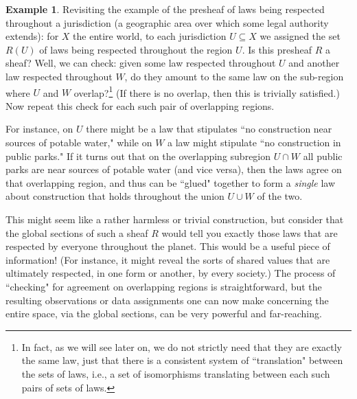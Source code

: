 \documentclass[a4paper]{book}
\theoremstyle{definition}
\newtheorem{example}{Example}[section]
\theoremstyle{definition}
\theoremstyle{definition}
\theoremstyle{theorem}
\theoremstyle{definition}
\begin{document}
	\begin{example}
	Revisiting the example of the presheaf of laws being respected throughout a jurisdiction (a geographic area over which some legal authority extends): for $X$ the entire world, to each jurisdiction $U \subseteq  X$ we assigned the set $R(U)$ of laws being respected throughout the region $U$. Is this presheaf $R$ a sheaf? Well, we can check: given some law respected throughout $U$ and another law respected throughout $W$, do they amount to the same law on the sub-region where $U$ and $W$ overlap?\footnote{In fact, as we will see later on, we do not strictly need that they are exactly the same law, just that there is a consistent system of ``translation" between the sets of laws, i.e., a set of isomorphisms translating between each such pairs of sets of laws.} (If there is no overlap, then this is trivially satisfied.) Now repeat this check for each such pair of overlapping regions.  \par 
	For instance, on $U$ there might be a law that stipulates ``no construction near sources of potable water," while on $W$ a law might stipulate ``no construction in public parks." If it turns out that on the overlapping subregion $U \cap W$ all public parks are near sources of potable water (and vice versa), then the laws agree on that overlapping region, and thus can be ``glued" together to form a \textit{single} law about construction that holds throughout the union $U \cup W$ of the two.  \par 
This might seem like a rather harmless or trivial construction, but consider that the global sections of such a sheaf $R$ would tell you exactly those laws that are respected by everyone throughout the planet. This would be a useful piece of information! (For instance, it might reveal the sorts of shared values that are ultimately respected, in one form or another, by every society.) The process of ``checking" for agreement on overlapping regions is straightforward, but the resulting observations or data assignments one can now make concerning the entire space, via the global sections, can be very powerful and far-reaching.   
\end{example}
\end{document}
